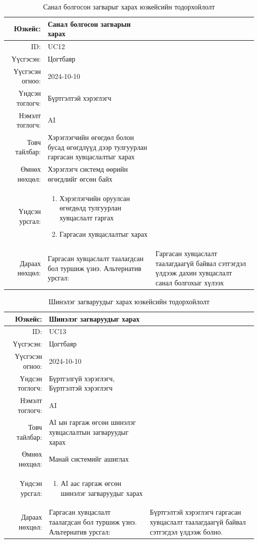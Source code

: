 \begin{longtable}{|r|p{11.5cm}|}
    \caption{Санал болгосон загварыг харах юзкейсийн тодорхойлолт} 
    \label{table:songolt4}\\ \hline
    {Юзкейс:} & {Санал болгосон загварын харах}\\ \hline
    {ID:} & {UC12}\\ \hline
    {Үүсгэсэн:} & {Цогтбаяр}\\ \hline
    {Үүсгэсэн огноо:} & {2024-10-10}\\ \hline
    {Үндсэн тоглогч:} & {Бүртгэлтэй хэрэглэгч}\\ \hline
    {Нэмэлт тоглогч:} & {AI}\\ \hline
    {Товч тайлбар:} & {Хэрэглэгчийн өгөгдөл болон бусад өгөгдлүүд дээр тулгуурлан гаргасан хувцаслалтыг харах }\\ \hline
    {Өмнөх нөхцөл:} & {Хэрэглэгч системд өөрийн өгөгдлийг өгсөн байх}\\ \hline
    {Үндсэн урсгал:} & {\begin{enumerate}
        \item Хэрэглэгчийн оруулсан өгөгдөлд тулгуурлан хувцаслалт гаргах
        \item Гаргасан хувцаслалтыг харах
    \end{enumerate}}\\ \hline
    {Дараах нөхцөл:} & {Гаргасан хувцаслалт таалагдсан бол туршиж үзнэ.} \hline
    {Альтернатив урсгал:} & {Гаргасан хувцаслалт таалагдаагүй байвал сэтгэгдэл үлдээж дахин хувцаслалт санал болгохыг хүлээх}\\ \hline
\end{longtable}
\newpage
\begin{longtable}{|r|p{11.5cm}|}
    \caption{Шинэлэг загваруудыг харах юзкейсийн тодорхойлолт} 
    \label{table:songolt4}\\ \hline
    {Юзкейс:} & {Шинэлэг загваруудыг харах}\\ \hline
    {ID:} & {UC13}\\ \hline
    {Үүсгэсэн:} & {Цогтбаяр}\\ \hline
    {Үүсгэсэн огноо:} & {2024-10-10}\\ \hline
    {Үндсэн тоглогч:} & {Бүртгэлгүй хэрэглэгч, Бүртгэлтэй хэрэглэгч}\\ \hline
    {Нэмэлт тоглогч:} & {AI}\\ \hline
    {Товч тайлбар:} & {АI ын гаргаж өгсөн шинэлэг хувцаслалтын загваруудыг харах }\\ \hline
    {Өмнөх нөхцөл:} & {Манай системийг ашиглах}\\ \hline
    {Үндсэн урсгал:} & {\begin{enumerate}
        \item АI аас гаргаж өгсөн шинэлэг загваруудыг харах
    \end{enumerate}}\\ \hline
    {Дараах нөхцөл:} & {Гаргасан хувцаслалт таалагдсан бол туршиж үзнэ.} \hline
    {Альтернатив урсгал:} & {Бүртгэлтэй хэрэглэгч гаргасан хувцаслалт таалагдаагүй байвал сэтгэгдэл үлдээж болно.}\\ \hline
\end{longtable}
